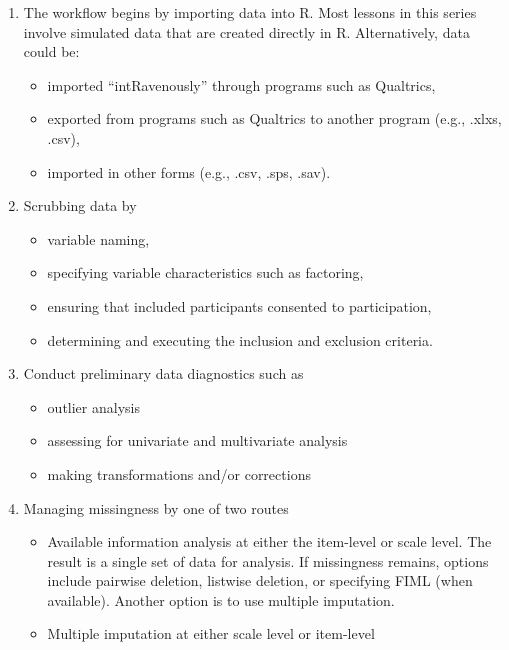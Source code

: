 \documentclass[
  11pt,
]{book}
\providecommand{\tightlist}{%
  \setlength{\itemsep}{0pt}\setlength{\parskip}{0pt}}
\begin{document}
\begin{enumerate}
\def\labelenumi{\arabic{enumi}.}
\tightlist
\item
  The workflow begins by importing data into R. Most lessons in this series involve simulated data that are created directly in R. Alternatively, data could be:

  \begin{itemize}
  \tightlist
  \item
    imported ``intRavenously'' through programs such as Qualtrics,
  \item
    exported from programs such as Qualtrics to another program (e.g., .xlxs, .csv),
  \item
    imported in other forms (e.g., .csv, .sps, .sav).
  \end{itemize}
\item
  Scrubbing data by

  \begin{itemize}
  \tightlist
  \item
    variable naming,
  \item
    specifying variable characteristics such as factoring,
  \item
    ensuring that included participants consented to participation,
  \item
    determining and executing the inclusion and exclusion criteria.
  \end{itemize}
\item
  Conduct preliminary data diagnostics such as

  \begin{itemize}
  \tightlist
  \item
    outlier analysis
  \item
    assessing for univariate and multivariate analysis
  \item
    making transformations and/or corrections
  \end{itemize}
\item
  Managing missingness by one of two routes

  \begin{itemize}
  \tightlist
  \item
    Available information analysis \citep{parent_handling_2013} at either the item-level or scale level. The result is a single set of data for analysis. If missingness remains, options include pairwise deletion, listwise deletion, or specifying FIML (when available). Another option is to use multiple imputation.
  \item
    Multiple imputation at either scale level or item-level
  \end{itemize}
\end{enumerate}
\end{document}
